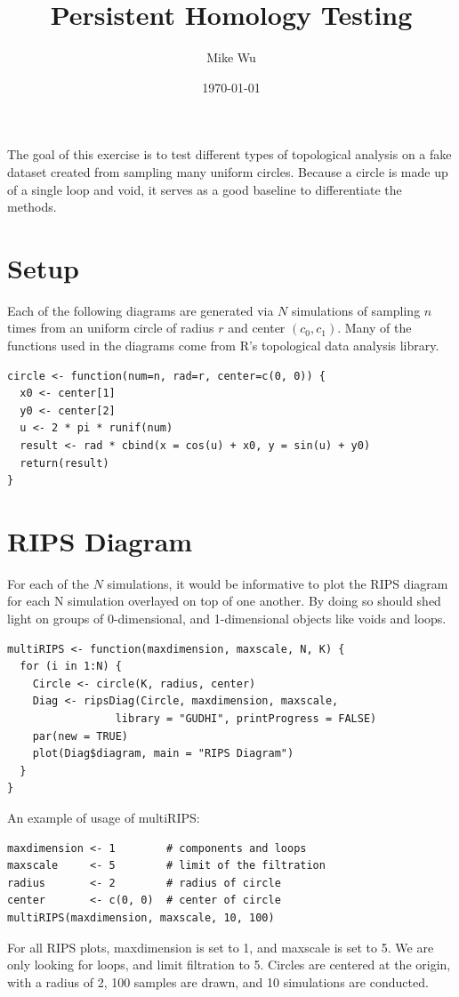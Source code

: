 \documentclass[a4paper]{article}
\title{Persistent Homology Testing}
\author{Mike Wu}
\date{\today}
\begin{document}
\maketitle

The goal of this exercise is to test different types of topological analysis on a fake dataset created from sampling many uniform circles. Because a circle is made up of a single loop and void, it serves as a good baseline to differentiate the methods. 

\section{Setup}
Each of the following diagrams are generated via $N$ simulations of sampling $n$ times from an uniform circle of radius $r$ and center $(c_{0}, c_{1})$. Many of the functions used in the diagrams come from R's topological data analysis library. 

\begin{lstlisting}
circle <- function(num=n, rad=r, center=c(0, 0)) {
  x0 <- center[1] 
  y0 <- center[2]
  u <- 2 * pi * runif(num)
  result <- rad * cbind(x = cos(u) + x0, y = sin(u) + y0)
  return(result)
}
\end{lstlisting}

\section{RIPS Diagram}
\noindent For each of the $N$ simulations, it would be informative to plot the RIPS diagram for each N simulation overlayed on top of one another. By doing so should shed light on groups of 0-dimensional, and 1-dimensional objects like voids and loops. 

\begin{lstlisting}
multiRIPS <- function(maxdimension, maxscale, N, K) {
  for (i in 1:N) {
    Circle <- circle(K, radius, center)
    Diag <- ripsDiag(Circle, maxdimension, maxscale, 
    		     library = "GUDHI", printProgress = FALSE)
    par(new = TRUE)
    plot(Diag$diagram, main = "RIPS Diagram")
  }
}
\end{lstlisting}

\noindent An example of usage of multiRIPS:
\begin{lstlisting}
maxdimension <- 1        # components and loops
maxscale     <- 5        # limit of the filtration
radius       <- 2        # radius of circle
center       <- c(0, 0)  # center of circle
multiRIPS(maxdimension, maxscale, 10, 100)
\end{lstlisting}
For all RIPS plots, maxdimension is set to 1, and maxscale is set to 5. We are only looking for loops, and limit filtration to 5. Circles are centered at the origin, with a radius of 2, 100 samples are drawn, and 10 simulations are conducted. 
\end{document}
